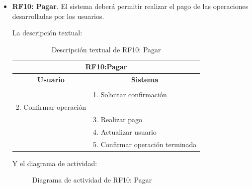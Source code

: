 \begin{itemize}
	\FloatBarrier
	\item \textbf{RF10: Pagar}. El sistema deberá permitir realizar el pago de las operaciones desarrolladas por los usuarios.
	
	La descripción textual:
	\begin{table}[h]
		\centering	
		\begin{tabular}{|l|l|}
			\hline
			\multicolumn{2}{|c|}{\textbf{RF10:Pagar}} \\ \hline
			\multicolumn{1}{|c|}{\textbf{Usuario}} & \multicolumn{1}{c|}{\textbf{Sistema}} \\ \hline
			[Pto. inclusión: RF06: Coger bicicleta] &\\ \hline
			& 1. Solicitar confirmación \\ \hline
			2. Confirmar operación &\\ \hline
			& 3. Realizar pago \\ \hline
			& 4. Actualizar usuario \\ \hline 
			& 5. Confirmar operación terminada \\ \hline 	
		\end{tabular}
		\caption{Descripción textual de RF10: Pagar}
		\label{tab:tablaDescTextualRF10}
	\end{table}
	
	Y el diagrama de actividad:
	\begin{figure}[!htb]
		\centering
		\caption{Diagrama de actividad de RF10: Pagar}
		\label{fig:diagramaActividad_RF10}
	\end{figure}
	

\end{itemize}
